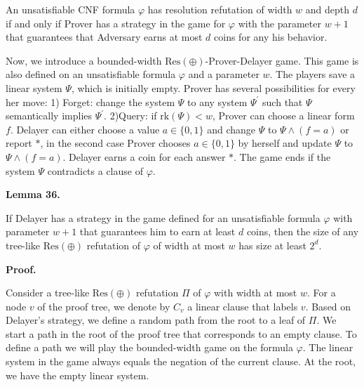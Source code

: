 An unsatisfiable CNF formula $\varphi$ has resolution refutation of width $w$ and depth $d$ if and only if Prover has a strategy in the game for $\varphi$ with the parameter $w+1$ that guarantees that Adversary earns at most $d$ coins for any his behavior.\par




Now, we introduce a bounded-width $\mathrm{Res}(\oplus)$-Prover-Delayer game. This game is also defined on an unsatisfiable formula $\varphi$ and a parameter $w$. The players save a linear system $\Psi$, which is initially empty. Prover has several possibilities for every her move: 1) Forget: change the system $\Psi$ to any system $\Psi^{\prime}$ such that $\Psi$ semantically implies $\Psi^{\prime}$. 2)Query: if $\mathrm{rk}(\Psi)<w$, Prover can choose a linear form $f$. Delayer can either choose a value $a\in\{0,1\}$ and change $\Psi$ to $\Psi\land(f=a)$ or report $*$, in the second case Prover chooses $a\in\{0,1\}$ by herself and update $\Psi$ to $\Psi\land(f=a)$. Delayer earns a coin for each answer $*$. The game ends if the system $\Psi$ contradicts a clause of $\varphi$.\par



\par\medskip\noindent\textbf{
Lemma 36.
}\par



If Delayer has a strategy in the game defined for an unsatisfiable formula $\varphi$ with parameter $w+1$ that guarantees him to earn at least $d$ coins, then the size of any tree-like $\mathrm{Res}(\oplus)$ refutation of $\varphi$ of width at most $w$ has size at least $2^{d}$.\par



\par\medskip\noindent\textbf{Proof.}\par


Consider a tree-like $\mathrm{Res}(\oplus)$ refutation $\Pi$ of $\varphi$ with width at most $w$.
For a node $v$ of the proof tree, we denote by $C_{v}$ a linear clause that labels $v$.
Based on Delayer’s strategy, we define a random path from the root to a leaf of $\Pi$. We start a path in the root of the proof tree that corresponds to an empty clause.
To define a path we will play the bounded-width game on the formula $\varphi$.
The linear system in the game always equals the negation of the current clause. At the root, we have the empty linear system.\par




